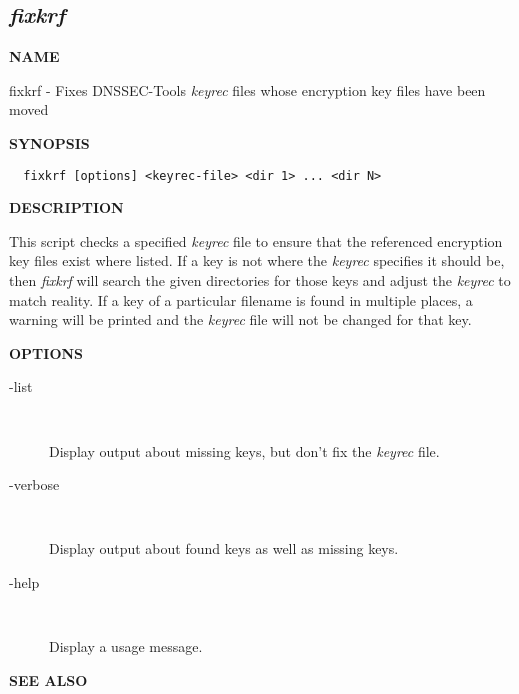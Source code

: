 \clearpage

\subsection{{\it fixkrf}}


{\bf NAME}

fixkrf - Fixes DNSSEC-Tools {\it keyrec} files whose encryption key files
have been moved

{\bf SYNOPSIS}

\begin{verbatim}
  fixkrf [options] <keyrec-file> <dir 1> ... <dir N>
\end{verbatim}

{\bf DESCRIPTION}

This script checks a specified {\it keyrec} file to ensure that the referenced
encryption key files exist where listed.  If a key is not where the {\it keyrec}
specifies it should be, then {\it fixkrf} will search the given directories for
those keys and adjust the {\it keyrec} to match reality.  If a key of a
particular filename is found in multiple places, a warning will be printed
and the {\it keyrec} file will not be changed for that key.

{\bf OPTIONS}

\begin{description}

\item [-list]\verb" "

Display output about missing keys, but don't fix the {\it keyrec} file.

\item [-verbose]\verb" "

Display output about found keys as well as missing keys.

\item [-help]\verb" "

Display a usage message.

\end{description}

{\bf SEE ALSO}



